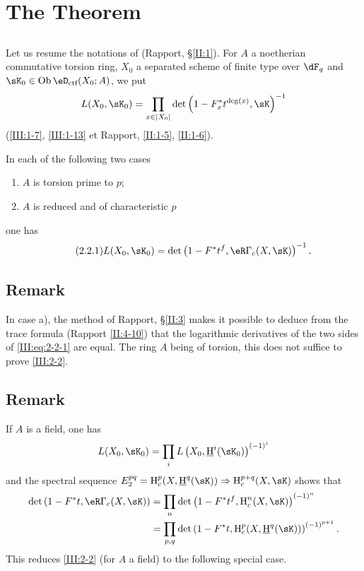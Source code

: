 \section{The Theorem}\label{III:2}




\subsection{}\label{III:2-1}

Let us resume the notations of (Rapport, \S\ref{II:1}). For $A$ a
noetherian commutative torsion ring, $X_0$ a separated scheme of finite type over
$\dF_q$ and $\sK_0\in\ob\eD_\text{ctf}(X_0;A)$, we put
\[
  L(X_0,\sK_0) = \prod_{x\in |X_0|} \det\left(1-F_x^* t^{\deg(x)}, \sK\right)^{-1}
\]
(\ref{III:1-7}, \ref{III:1-13} et Rapport, \ref{II:1-5}, \ref{II:1-6}).




\begin{theorem_}\label{III:2-2}
In each of the following two cases
\begin{enumerate}[\indent a)]
  \item $A$ is torsion prime to $p$;
  \item $A$ is reduced and of characteristic $p$
\end{enumerate}
one has
\begin{equation*}\tag{2.2.1}\label{III:eq:2-2-1}
  L(X_0,\sK_0) = \det\left(1-F^* t^f, \eR\Gamma_c(X,\sK)\right)^{-1} \text{.}
\end{equation*}
\end{theorem_}




\subsection{Remark}\label{III:2-3}

In case a), the method of Rapport, \S\ref{II:3} makes it possible to deduce from
the trace formula (Rapport \ref{II:4-10}) that the logarithmic derivatives
of the two sides of \eqref{III:eq:2-2-1} are equal. The ring $A$ being of
torsion, this does not suffice to prove \ref{III:2-2}.




\subsection{Remark}\label{III:2-4}

If $A$ is a field, one has
\[
  L(X_0,\sK_0) = \prod_i L\left(X_0,\underline\h^i(\sK_0)\right)^{(-1)^i}
\]
and the spectral sequence
$E_2^{p q} = \h_c^p(X,\underline\h^q(\sK))\Rightarrow \h_c^{p+q}(X,\sK)$ shows
that
\begin{align*}
  \det\left(1-F^* t, \eR\Gamma_c(X,\sK)\right)
    &= \prod_n \det\left(1-F^* t^f,\h_c^n(X,\sK)\right)^{(-1)^n} \\
    &= \prod_{p,q} \det\left(1-F^* t,\h_c^p(X,\underline\h^q(\sK))\right)^{(-1)^{p+1}} \text{.}
\end{align*}
This reduces \ref{III:2-2} (for $A$ a field) to the following special case.


